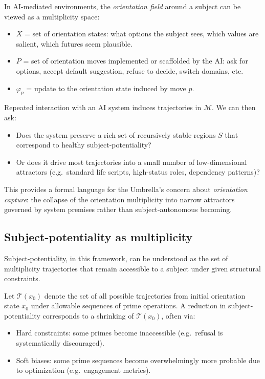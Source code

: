 \documentclass[11pt]{article}
\begin{document}
In AI-mediated environments, the \emph{orientation field} around a subject can be viewed as a multiplicity space:

\begin{itemize}[nosep]
  \item \(X\) = set of orientation states: what options the subject sees, which values are salient, which futures seem plausible.
  \item \(P\) = set of orientation moves implemented or scaffolded by the AI: ask for options, accept default suggestion, refuse to decide, switch domains, etc.
  \item \(\varphi_p\) = update to the orientation state induced by move \(p\).
\end{itemize}

Repeated interaction with an AI system induces trajectories in \(\mathcal{M}\). We can then ask:

\begin{itemize}[nosep]
  \item Does the system preserve a rich set of recursively stable regions \(S\) that correspond to healthy subject-potentiality?
  \item Or does it drive most trajectories into a small number of low-dimensional attractors (e.g.\ standard life scripts, high-status roles, dependency patterns)?
\end{itemize}

This provides a formal language for the Umbrella's concern about \emph{orientation capture}: the collapse of the orientation multiplicity into narrow attractors governed by system premises rather than subject-autonomous becoming.

\subsection{Subject-potentiality as multiplicity}

Subject-potentiality, in this framework, can be understood as the set of multiplicity trajectories that remain accessible to a subject under given structural constraints.

Let \(\mathcal{T}(x_0)\) denote the set of all possible trajectories from initial orientation state \(x_0\) under allowable sequences of prime operations. A reduction in subject-potentiality corresponds to a shrinking of \(\mathcal{T}(x_0)\), often via:

\begin{itemize}[nosep]
  \item Hard constraints: some primes become inaccessible (e.g.\ refusal is systematically discouraged).
  \item Soft biases: some prime sequences become overwhelmingly more probable due to optimization (e.g.\ engagement metrics).
\end{itemize}
\end{document}

